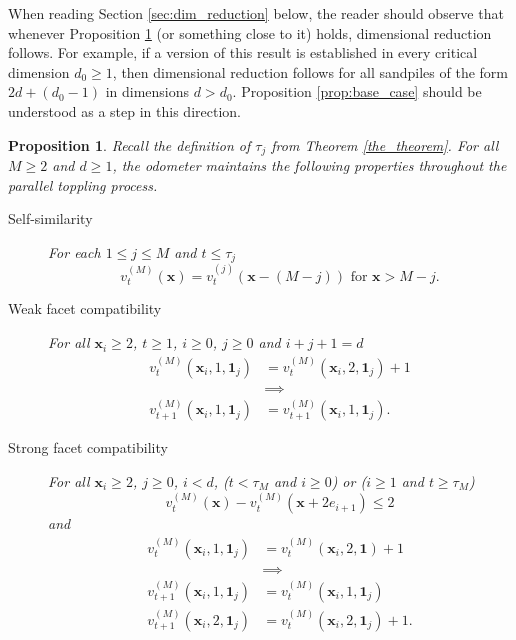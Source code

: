 \documentclass[12pt]{amsart}
\newtheorem{prop}{Proposition}[section]
\begin{document}
		When reading Section \ref{sec:dim_reduction} below, the reader should observe that whenever Proposition \ref{base_dimension} (or something close to it) holds, dimensional reduction 
		follows. For example, if a version of this result is established in every critical dimension $d_0 \geq 1$,  
		then dimensional reduction follows for all sandpiles of the form $2 d + (d_0 - 1)$ in dimensions $d > d_0$. 
		Proposition \ref{prop:base_case} should be understood as a step in this direction. 


	
	
	
	\begin{prop}\label{base_dimension}
		Recall the definition of $\tau_{j}$ from Theorem \ref{the_theorem}. For all $M \geq 2$ and $d \geq 1$, the odometer maintains the following properties throughout the parallel toppling process.
		\begin{description}
			\item[Self-similarity]  For each $1 \leq j \leq M$ and $t \leq \tau_j$ 
			\begin{equation} \label{base_dimension:consistency}
			v_t^{(M)}(\mathbf{x}) =  v_t^{(j)}(\mathbf{x}-(M-j))  \mbox{ for $\mathbf{x} > M-j$}.
			\end{equation}
			\item[Weak facet compatibility] For all $\mathbf{x}_i \geq 2$, $t \geq 1$, $i \geq 0$, $j \geq 0$ and $i+j+1=d$
			\begin{equation} \label{base_dimension:weak_compatability}
			\begin{aligned}
			v_t^{(M)}(\mathbf{x}_i, 1, \mathbf{1}_j) &= v_t^{(M)}(\mathbf{x}_i, 2, \mathbf{1}_j)+ 1  \\
			& \implies \\
			v_{t+1}^{(M)}(\mathbf{x}_i, 1, \mathbf{1}_j) &= v_{t+1}^{(M)}(\mathbf{x}_i, 1, \mathbf{1}_j).
			\end{aligned} 
			\end{equation}
			\item[Strong facet compatibility] For all $\mathbf{x}_i \geq 2$, $j \geq 0$, $i < d$, 
			($t < \tau_M$ and $i \geq 0$) or ($i \geq 1$ and $t \geq \tau_M$)
			\begin{equation} \label{base_dimension:strong_derivative}
			v_t^{(M)}(\mathbf{x}) - v_t^{(M)}(\mathbf{x} + 2 e_{i+1}) \leq 2
			\end{equation}
			and
			\begin{equation} \label{base_dimension:strong_compatability}
			\begin{aligned} 
			v_t^{(M)}(\mathbf{x}_i, 1, \mathbf{1}_j) &= v_t^{(M)}(\mathbf{x}_i, 2, \mathbf{1})+ 1 \\
			& \implies \\
			v_{t+1}^{(M)}(\mathbf{x}_i, 1, \mathbf{1}_j) &= v_{t}^{(M)}(\mathbf{x}_i, 1, \mathbf{1}_j) \\
			v_{t+1}^{(M)}(\mathbf{x}_i, 2, \mathbf{1}_j) &= v_{t}^{(M)}(\mathbf{x}_i, 2, \mathbf{1}_j)+1.
			\end{aligned}
			\end{equation}


\end{description}
\end{prop}
\end{document}
